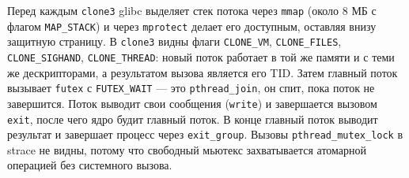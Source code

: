 Перед каждым \texttt{clone3} glibc выделяет стек потока через \texttt{mmap} (около 8 МБ с флагом \texttt{MAP\_STACK}) и через \texttt{mprotect} делает его доступным, оставляя внизу защитную страницу. В \texttt{clone3} видны флаги \texttt{CLONE\_VM}, \texttt{CLONE\_FILES}, \texttt{CLONE\_SIGHAND}, \texttt{CLONE\_THREAD}: новый поток работает в той же памяти и с теми же дескрипторами, а результатом вызова является его TID. Затем главный поток вызывает \texttt{futex} с \texttt{FUTEX\_WAIT} --- это \texttt{pthread\_join}, он спит, пока поток не завершится. Поток выводит свои сообщения (\texttt{write}) и завершается вызовом \texttt{exit}, после чего ядро будит главный поток. В конце главный поток выводит результат и завершает процесс через \texttt{exit\_group}. Вызовы \texttt{pthread\_mutex\_lock} в strace не видны, потому что свободный мьютекс захватывается атомарной операцией без системного вызова.


